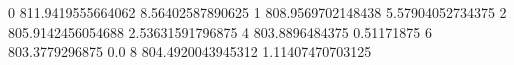 0 811.9419555664062 8.56402587890625
1 808.9569702148438 5.57904052734375
2 805.9142456054688 2.53631591796875
4 803.8896484375 0.51171875
6 803.3779296875 0.0
8 804.4920043945312 1.11407470703125
